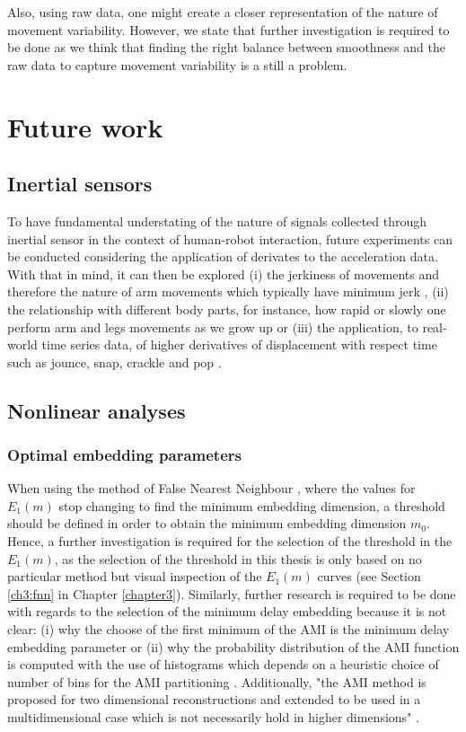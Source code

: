 Also, using raw data, one might create a closer representation of the 
nature of movement variability.
However, we state that further investigation is required to be done
as we think that finding the right balance between 
smoothness and the raw data to capture movement variability is 
a still a problem.


\section{Future work}

\subsection*{Inertial sensors}
To have fundamental understating of the nature of signals collected 
through inertial sensor in the context of human-robot interaction,
future experiments can be conducted considering the application of 
derivates to the acceleration data. 
With that in mind, it can then be explored 
(i) the jerkiness of movements and therefore the nature of arm movements 
which typically have minimum jerk \citep{flash1985},
(ii) the relationship with different body parts, for instance, 
how rapid or slowly one perform arm and legs movements as we grow up 
\citep{devries1982, mori2012} or (iii) 
the application, to real-world time series data, of higher derivatives 
of displacement with respect time such as jounce, snap, 
crackle and pop \citep{eager2016}.


\subsection*{Nonlinear analyses}

\subsubsection*{Optimal embedding parameters}
When using the method of False Nearest Neighbour \citep{Cao1997}, where 
the values for $E_1(m)$ stop changing to find the minimum embedding 
dimension, a threshold should be defined in order to obtain the minimum 
embedding dimension $m_0$. Hence, a further investigation is required 
for the selection of the threshold in the $E_1(m)$, as the selection 
of the threshold in this thesis is only based on no particular method 
but visual inspection of the $E_1(m)$ curves
(see Section \ref{ch3:fnn} in Chapter \ref{chapter3}).
Similarly, further research is required to be done with regards to the 
selection of the minimum delay embedding because it is not clear:
(i) why the choose of the first minimum of the AMI is the minimum delay 
embedding parameter \citep{kantz2003} or 
(ii) why the probability distribution of the AMI function 
is computed with the use of histograms which depends on a heuristic 
choice of number of bins for the AMI partitioning \citep{garcia2005e71}. 
Additionally, "the AMI method is proposed for two dimensional 
reconstructions and extended to be used in a multidimensional case 
which is not necessarily hold in higher dimensions" 
\citep[p. 156]{gomezgarcia2014}.


